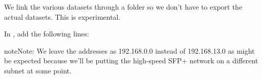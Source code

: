 \documentclass[a4paper,10pt,english]{sphinxmanual}
\begin{document}
\begin{sphinxVerbatim}[commandchars=\\\{\}]
   
\end{sphinxVerbatim}

We link the various datasets through a folder so we don’t have to export the
actual datasets. This is experimental.

\begin{sphinxVerbatim}[commandchars=\\\{\}]
 

   
   
   
   
   
\end{sphinxVerbatim}

In , add the following lines:

\begin{sphinxadmonition}{note}{Note:}
We leave the addresses as 192.168.0.0 instead of 192.168.13.0 as
might be expected because we’ll be putting the high-speed SFP+
network on a different subnet at some point.
\end{sphinxadmonition}
\end{document}
